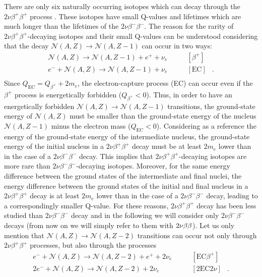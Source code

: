 \marginnote{$2\nu\beta^+\beta^+$} There are only six naturally occurring isotopes which can decay through the $2\nu\beta^+\beta^+$ process \cite{Haxton:1985am}. These isotopes have small Q-values and lifetimes which are much longer than the lifetimes of the $2\nu\beta^-\beta^-$. The reason for the rarity of $2\nu\beta^+\beta^+$-decaying isotopes and their small Q-values can be understood considering that the decay $\mathcal{N}(A,Z)\rightarrow\mathcal{N}(A,Z-1)$ can occur in two ways:
\[
	\begin{array}{lrl}
		\mathcal{N}(A,Z)\rightarrow\mathcal{N}(A,Z-1)+e^++\nu_e & \qquad [\beta^+] & \\
		e^-+\mathcal{N}(A,Z)\rightarrow\mathcal{N}(A,Z-1)+\nu_e & \qquad [\text{EC}]&. \\
	\end{array}
\]
Since $Q_\text{EC} = Q_{\beta^+}+2m_e$, the electron-capture process (EC) can occur even if the $\beta^+$ process is energetically forbidden ($Q_{\beta^+}<0$). Thus, in order to have an energetically forbidden $\mathcal{N}(A,Z)\rightarrow\mathcal{N}(A,Z-1)$ transitions, the ground-state energy of $\mathcal{N}(A,Z)$ must be smaller than the ground-state energy of the nucleus $\mathcal{N}(A,Z-1)$ minus the electron mass ($Q_\text{EC}<0$). Considering as a reference the energy of the ground-state energy of the intermediate nucleus, the ground-state energy of the initial nucleus in a $2\nu\beta^+\beta^+$ decay must be at least $2m_e$ lower than in the case of a $2\nu\beta^-\beta^-$ decay. This implies that $2\nu\beta^+\beta^+$-decaying isotopes are more rare than $2\nu\beta^-\beta^-$-decaying isotopes. Moreover, for the same energy difference between the ground states of the intermediate and final nuclei, the energy difference between the ground states of the initial and final nucleus in a $2\nu\beta^+\beta^+$ decay is at least $2m_e$ lower than in the case of a $2\nu\beta^-\beta^-$ decay, leading to a correspondingly smaller Q-value. For these reasons, $2\nu\beta^+\beta^+$ decay has been less studied than $2\nu\beta^-\beta^-$ decay and in the following we will consider only $2\nu\beta^-\beta^-$ decays (from now on we will simply refer to them with $2\nu\beta\beta$). Let us only mention that $\mathcal{N}(A,Z)\rightarrow\mathcal{N}(A,Z-2)$ transitions can occur not only through $2\nu\beta^+\beta^+$ processes, but also through the processes 
\[
	\begin{array}{lrl}
		e^-+\mathcal{N}(A,Z)\rightarrow\mathcal{N}(A,Z-2)+e^++2\nu_e & \qquad [\text{EC}\beta^+] & \\
		2e^-+\mathcal{N}(A,Z)\rightarrow\mathcal{N}(A,Z-2)+2\nu_e & \qquad [2\text{EC}2\nu] & . \\
	\end{array}
\]

